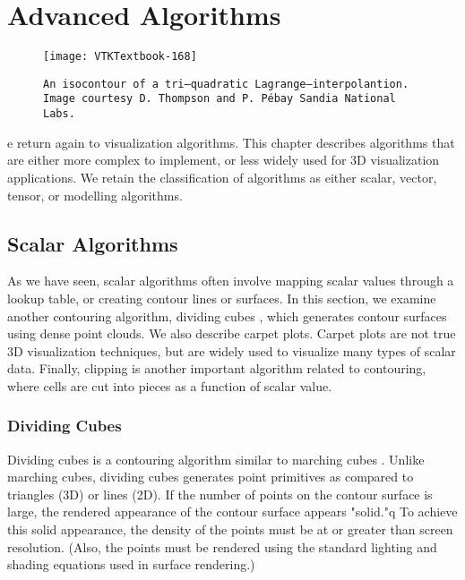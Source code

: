 \chapter{Advanced Algorithms}
\label{chap:advanced_algorithms}

\begin{figure}[ht]
	\hfill
	\begin{minipage}{0.5\textwidth}
		\centering
		\texttt{[image: VTKTextbook-168]}
		\caption*{\texttt{An isocontour of a tri--quadratic Lagrange--interpolantion. Image courtesy D. Thompson and P. Pébay Sandia National Labs.}}
	\end{minipage}
\end{figure}

e return again to visualization algorithms.
This chapter describes algorithms that are either more complex to implement, or less widely used for 3D visualization applications.
We retain the classification of algorithms as either scalar, vector, tensor, or modelling algorithms.

\section{Scalar Algorithms}

As we have seen, scalar algorithms often involve mapping scalar values through a lookup table, or creating contour lines or surfaces.
In this section, we examine another contouring algorithm, dividing cubes , which generates contour surfaces using dense point clouds.
We also describe carpet plots.
Carpet plots are not true 3D visualization techniques, but are widely used to visualize many types of scalar data.
Finally, clipping is another important algorithm related to contouring, where cells are cut into pieces as a function of scalar value.

\subsection{Dividing Cubes}

Dividing cubes is a contouring algorithm similar to marching cubes \cite{Cline88}. Unlike marching cubes, dividing cubes generates point primitives as compared to triangles (3D) or lines (2D). If the number of points on the contour surface is large, the rendered appearance of the contour surface appears "solid."q To achieve this solid appearance, the density of the points must be at or greater than screen resolution. (Also, the points must be rendered using the standard lighting and shading equations used in surface rendering.)

